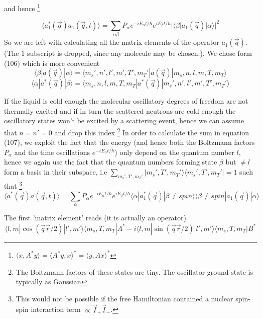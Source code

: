 \documentclass[11pt,a4paper]{article}
\begin{document}
and hence \footnote{$\langle x, A^* y \rangle = \langle A^* y ,x \rangle^* = \langle y , A x \rangle^*$}

\begin{equation}
\langle a_{1}^{*} (\vec q) a_1 (\vec q, t)\rangle
=
\sum_{\alpha \beta} P_{\alpha} e^{-i E_{\alpha}t/\hbar } e^{i E_{\beta} t/\hbar}
| \langle \beta | a_1 (\vec q) |  \alpha \rangle |^2
\end{equation}
So we are left with calculating all the matrix elements of the operator $a_1 (\vec q)$. (The 1 subscript is dropped, since
any molecule may be chosen.). We chose form (106) which is more convenient
\begin{equation}
\langle \beta | a (\vec q) |  \alpha \rangle
=
\langle m_s', n', l',m', T', m_T' | a (\vec q) | m_s,n, l,m,T,m_T \rangle
\end{equation}
\begin{equation}
\langle \alpha | a^* (\vec q) |  \beta \rangle
=
\langle m_s, n, l,m, T, m_T | a^* (\vec q) | m_s',n', l',m',T',m_T' \rangle
\end{equation}

If the liquid is cold enough the molecular oscillatory degrees of freedom are not thermally excited and if in turn the scattered neutrons
are cold enough the oscillatory states won't be excited by a scattering event, hence we can assume that $n = n' =0$ and drop this index
\footnote{The Boltzmann factors of these states are tiny. The oscillator ground state is typically as Gaussian} \newline
In order to calculate the sum in equation (107), we exploit the fact that the energy (and hence both the Boltzmann factors
$P_{\alpha}$ and the time oscillations  $e^{-i E_{\alpha}t/\hbar }$) only depend on the quantum number $l$, hence we
again use the fact that the quantum numbers forming state $\beta$ but $\ne l$ form a basis in their subspace, i.e
$\sum_{m_s',T',m_T'} |m_s',T',m_T' \rangle \langle m_s', T',m_T'| = 1 $ such that \footnote{This would not be possible if the free Hamiltonian
contained a nuclear spin-spin interaction term $\propto \vec I_{+}\vec I_{-}$.}
\begin{equation}
\langle a^{*} (\vec q) a (\vec q, t)\rangle
=
\sum_{ \alpha} P_{\alpha} e^{-i E_{\alpha}t/\hbar } e^{i E_{\beta} t/\hbar}
\langle \alpha | a_{1}^{*} (\vec q)|\beta \ne spin \rangle \langle \beta \ne spin| a_1 (\vec q) |  \alpha \rangle
\end{equation}

\newpage
The first 'matrix element' reads (it is actually an operator)
\begin{equation}
\langle l,m | \cos (\vec q \vec r /2)|  l',m' \rangle \langle m_s, T, m_T | A^*
- i
\langle l,m | \sin (\vec q \vec r /2)|  l',m' \rangle \langle m_s, T, m_T | B^*
\end{equation}
\end{document}
